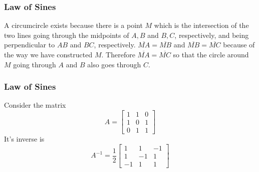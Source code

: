 \documentclass[xcolor=dvipsnames]{beamer}
\begin{document}
\begin{frame}
  \frametitle{Law of Sines}
A circumcircle exists because there is a point $M$ which is
    the intersection of the two lines going through the
    midpoints of $A,B$ and $B,C$, respectively, and being
    perpendicular to $AB$ and $BC$, respectively.
    $\overline{MA}=\overline{MB}$ and $\overline{MB}=\overline{MC}$
    because of the way we have constructed $M$. Therefore
    $\overline{MA}=\overline{MC}$ so that the circle around $M$ going
    through $A$ and $B$ also goes through $C$.
\end{frame}

\begin{frame}
  \frametitle{Law of Sines}
  Consider the matrix
    \begin{equation}
      \label{eq:thiakohk}
    A=\left[
    \begin{array}{ccc}
      1&1&0 \\
       1&0&1 \\
       0&1&1
    \end{array}\right]
    \end{equation}
    It's inverse is
    \begin{equation}
      \label{eq:gajeerie}
      A^{-1}=\frac{1}{2}\left[
        \begin{array}{ccc}
          1&1&-1 \\
           1&-1&1 \\
           -1&1&1
        \end{array}\right]
    \end{equation}
\end{frame}
\end{document}
